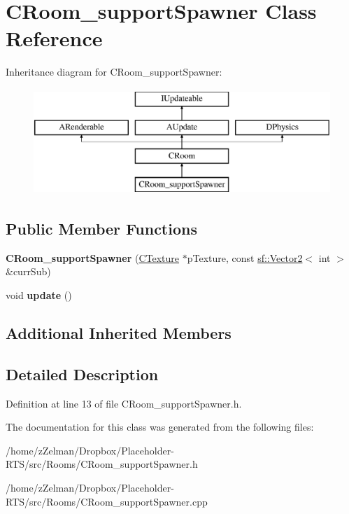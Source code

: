 \hypertarget{classCRoom__supportSpawner}{\section{C\-Room\-\_\-support\-Spawner Class Reference}
\label{classCRoom__supportSpawner}
}
Inheritance diagram for C\-Room\-\_\-support\-Spawner\-:\begin{figure}[H]
\begin{center}
\leavevmode
\includegraphics[height=4.000000cm]{classCRoom__supportSpawner}
\end{center}
\end{figure}
\subsection*{Public Member Functions}
\begin{DoxyCompactItemize}
\item 
\hypertarget{classCRoom__supportSpawner_a9cc8c824228709db6db90b8dd75988cf}{{\bfseries C\-Room\-\_\-support\-Spawner} (\hyperlink{classCTexture}{C\-Texture} $\ast$p\-Texture, const \hyperlink{classsf_1_1Vector2}{sf\-::\-Vector2}$<$ int $>$ \&curr\-Sub)}\label{classCRoom__supportSpawner_a9cc8c824228709db6db90b8dd75988cf}

\item 
\hypertarget{classCRoom__supportSpawner_a509e95652394c868388b79b2e98d67f0}{void {\bfseries update} ()}\label{classCRoom__supportSpawner_a509e95652394c868388b79b2e98d67f0}

\end{DoxyCompactItemize}
\subsection*{Additional Inherited Members}


\subsection{Detailed Description}


Definition at line 13 of file C\-Room\-\_\-support\-Spawner.\-h.



The documentation for this class was generated from the following files\-:\begin{DoxyCompactItemize}
\item 
/home/z\-Zelman/\-Dropbox/\-Placeholder-\/\-R\-T\-S/src/\-Rooms/C\-Room\-\_\-support\-Spawner.\-h\item 
/home/z\-Zelman/\-Dropbox/\-Placeholder-\/\-R\-T\-S/src/\-Rooms/C\-Room\-\_\-support\-Spawner.\-cpp\end{DoxyCompactItemize}
